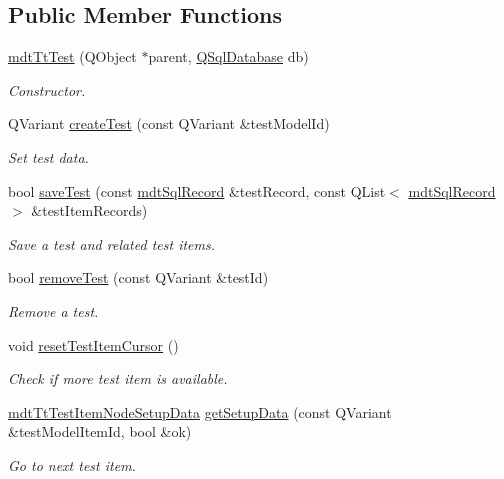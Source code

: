 \subsection*{Public Member Functions}
\begin{DoxyCompactItemize}
\item 
\hyperlink{classmdt_tt_test_a607eadd86d30aa34dbd9daaf4c03725c}{mdt\-Tt\-Test} (Q\-Object $\ast$parent, \hyperlink{class_q_sql_database}{Q\-Sql\-Database} db)
\begin{DoxyCompactList}\small\item\em Constructor. \end{DoxyCompactList}\item 
Q\-Variant \hyperlink{classmdt_tt_test_a07249bc1f02d16974af0b171d7e391de}{create\-Test} (const Q\-Variant \&test\-Model\-Id)
\begin{DoxyCompactList}\small\item\em Set test data. \end{DoxyCompactList}\item 
bool \hyperlink{classmdt_tt_test_a816f7197031e96148996333b9c625702}{save\-Test} (const \hyperlink{classmdt_sql_record}{mdt\-Sql\-Record} \&test\-Record, const Q\-List$<$ \hyperlink{classmdt_sql_record}{mdt\-Sql\-Record} $>$ \&test\-Item\-Records)
\begin{DoxyCompactList}\small\item\em Save a test and related test items. \end{DoxyCompactList}\item 
bool \hyperlink{classmdt_tt_test_a8dc26af849b8e928385e5f25697ebb47}{remove\-Test} (const Q\-Variant \&test\-Id)
\begin{DoxyCompactList}\small\item\em Remove a test. \end{DoxyCompactList}\item 
void \hyperlink{classmdt_tt_test_ae8cafeb9cebf1c11ca136a94ba75020c}{reset\-Test\-Item\-Cursor} ()
\begin{DoxyCompactList}\small\item\em Check if more test item is available. \end{DoxyCompactList}\item 
\hyperlink{classmdt_tt_test_item_node_setup_data}{mdt\-Tt\-Test\-Item\-Node\-Setup\-Data} \hyperlink{classmdt_tt_test_a71e868fa2c182b33982276e52f9c4d23}{get\-Setup\-Data} (const Q\-Variant \&test\-Model\-Item\-Id, bool \&ok)
\begin{DoxyCompactList}\small\item\em Go to next test item. \end{DoxyCompactList}\item 

\end{DoxyCompactItemize}

